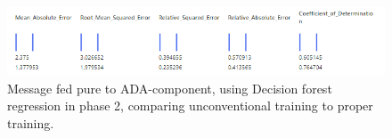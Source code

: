 \begin{figure}[htb]
    \centering
    \includegraphics[width=150mm]{./appendices/msg_pure_decision-forest-reg_lewd2proper.png}
    \caption{Message fed pure to ADA-component,
    using Decision forest regression in phase 2,
        comparing unconventional training to proper training.
        \label{fig:msg_pure_decision-forest-reg_lewd2proper}}
\end{figure}

\clearpage